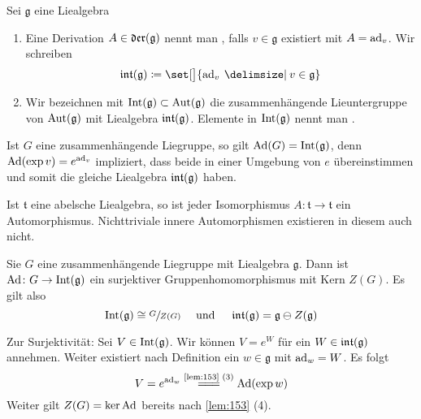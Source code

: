 \begin{definition}[{name=[innere Derivationen und innere Automorphismen]}]
	Sei $\mathfrak{g}$ eine Liealgebra
	\begin{enumerate}[1)]
		\item Eine Derivation $A \in \mathop{\mathfrak{der}}(\mathfrak{g})$ nennt man , falls $v \in \mathfrak{g}$ existiert mit $A = \operatorname{ad}_v$.
		Wir schreiben 
		\[
			\intAlg(\mathfrak{g}) \coloneqq \set[\big]{\ad_v \given v \in \mathfrak{g}}
		\] 
		\item Wir bezeichnen mit $\operatorname{Int}(\mathfrak{g}) \subset \operatorname{Aut}(\mathfrak{g})$ die zusammenhängende Lieuntergruppe von $\operatorname{Aut}(\mathfrak{g})$ mit Liealgebra $\mathop{\mathfrak{int}}(\mathfrak{g})$.
		Elemente in $\operatorname{Int}(\mathfrak{g})$ nennt man .
	\end{enumerate}
\end{definition}

Ist $G$ eine zusammenhängende Liegruppe, so gilt $\operatorname{Ad}(G) = \operatorname{Int}(\mathfrak{g})$, denn $\Ad \enbrace*{\exp v} = e^{\ad_{v}}$ impliziert, dass beide in einer Umgebung von $e$ übereinstimmen und somit die gleiche Liealgebra $\mathop{\mathfrak{int}}(\mathfrak{g})$ haben.

\begin{beispiel*}[{name=[Automorphismen einer abelsche Liealgebra]}]
	Ist $\mathfrak{t}$ eine abelsche Liealgebra, so ist jeder Isomorphismus $A \colon \mathfrak{t} \to \mathfrak{t}$ ein Automorphismus.
	Nichttriviale innere Automorphismen existieren in diesem auch nicht.
\end{beispiel*}

\begin{lemma}[{name=[Adjungierte Darstellung surjektiv auf innere Automorphismen (zusammenhängend)]},label=lem:164]
	Sie $G$ eine zusammenhängende Liegruppe mit Liealgebra $\mathfrak{g}$.
	Dann ist $\operatorname{Ad} \colon G \to \operatorname{Int}(\mathfrak{g})$ ein surjektiver Gruppenhomomorphismus mit Kern $Z(G)$.
	Es gilt also
	\[
		\operatorname{Int}(\mathfrak{g}) \cong \sfrac{G}{Z(G)} \quad \text{ und } \quad \mathop{\mathfrak{int}}(\mathfrak{g}) = \mathfrak{g} \ominus Z(\mathfrak{g})
	\]
\end{lemma}
\begin{beweis}
	Zur Surjektivität: Sei $V \in \operatorname{Int}(\mathfrak{g})$.
	Wir können $V= e^W$ für ein $W \in \mathop{\mathfrak{int}}(\mathfrak{g})$ annehmen.
	Weiter existiert nach Definition ein $w \in \mathfrak{g}$ mit $\operatorname{ad}_w = W$.
	Es folgt
	\[
		V = e^{\ad_w} \StackText{\ref{lem:153} (3)}{=\joinrel=\joinrel=} \Ad(\exp w)
	\]
	Weiter gilt $Z(G)= \ker \operatorname{Ad}$ bereits nach \autoref{lem:153} (4).
\end{beweis}

